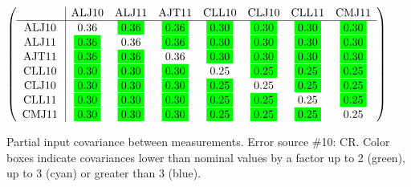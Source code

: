 \begin{table}[H]
\scriptsize
\begin{center}
\renewcommand{\arraystretch}{1.1}
\begin{math}\left(\begin{array}{c|ccccccc}
 & \mathrm{ALJ10} & 
\mathrm{ALJ11} & 
\mathrm{AJT11} & 
\mathrm{CLL10} & 
\mathrm{CLJ10} & 
\mathrm{CLL11} & 
\mathrm{CMJ11} \\
\hline
\mathrm{ALJ10} \hspace*{2pt} &       0.36 &  \colorbox{Green1}{$      0.36$} &  \colorbox{Green1}{$      0.36$} &  \colorbox{Green1}{$      0.30$} &  \colorbox{Green1}{$      0.30$} &  \colorbox{Green1}{$      0.30$} &  \colorbox{Green1}{$      0.30$} \\
\mathrm{ALJ11} \hspace*{2pt} &  \colorbox{Green1}{$      0.36$} &       0.36 &  \colorbox{Green1}{$      0.36$} &  \colorbox{Green1}{$      0.30$} &  \colorbox{Green1}{$      0.30$} &  \colorbox{Green1}{$      0.30$} &  \colorbox{Green1}{$      0.30$} \\
\mathrm{AJT11} \hspace*{2pt} &  \colorbox{Green1}{$      0.36$} &  \colorbox{Green1}{$      0.36$} &       0.36 &  \colorbox{Green1}{$      0.30$} &  \colorbox{Green1}{$      0.30$} &  \colorbox{Green1}{$      0.30$} &  \colorbox{Green1}{$      0.30$} \\
\mathrm{CLL10} \hspace*{2pt} &  \colorbox{Green1}{$      0.30$} &  \colorbox{Green1}{$      0.30$} &  \colorbox{Green1}{$      0.30$} &       0.25 &  \colorbox{Green1}{$      0.25$} &  \colorbox{Green1}{$      0.25$} &  \colorbox{Green1}{$      0.25$} \\
\mathrm{CLJ10} \hspace*{2pt} &  \colorbox{Green1}{$      0.30$} &  \colorbox{Green1}{$      0.30$} &  \colorbox{Green1}{$      0.30$} &  \colorbox{Green1}{$      0.25$} &       0.25 &  \colorbox{Green1}{$      0.25$} &  \colorbox{Green1}{$      0.25$} \\
\mathrm{CLL11} \hspace*{2pt} &  \colorbox{Green1}{$      0.30$} &  \colorbox{Green1}{$      0.30$} &  \colorbox{Green1}{$      0.30$} &  \colorbox{Green1}{$      0.25$} &  \colorbox{Green1}{$      0.25$} &       0.25 &  \colorbox{Green1}{$      0.25$} \\
\mathrm{CMJ11} \hspace*{2pt} &  \colorbox{Green1}{$      0.30$} &  \colorbox{Green1}{$      0.30$} &  \colorbox{Green1}{$      0.30$} &  \colorbox{Green1}{$      0.25$} &  \colorbox{Green1}{$      0.25$} &  \colorbox{Green1}{$      0.25$} &       0.25 \\
\end{array}\right)\end{math}
\caption{Partial input covariance between measurements. Error source \#10: CR. Color boxes indicate covariances lower than nominal values by a factor up to 2 (green), up to 3 (cyan) or greater than 3 (blue).}
\renewcommand{\arraystretch}{1}
\end{center}
\end{table}
